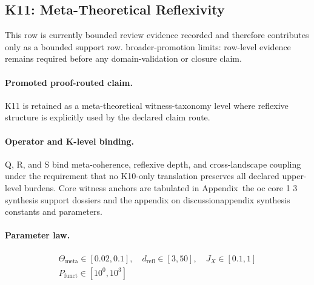 \subsection{K11: Meta-Theoretical Reflexivity}
\label{sec:oc-core-1-3-synthesis-k11}
This row is currently bounded review evidence recorded and therefore contributes only as a bounded support row.
broader-promotion limits: row-level evidence remains required before any domain-validation or closure claim.

\paragraph{Promoted proof-routed claim.}
K11 is retained as a meta-theoretical witness-taxonomy level where reflexive structure is explicitly used by the declared claim route.

\paragraph{Operator and K-level binding.}
Q, R, and S bind meta-coherence, reflexive depth, and cross-landscape coupling under the requirement that no K10-only translation preserves all declared upper-level burdens.
Core witness anchors are tabulated in Appendix~the oc core 1 3 synthesis support dossiers and the appendix on discussionappendix synthesis constants and parameters.

\paragraph{Parameter law.}
\[
\begin{gathered} \Theta_{\mathrm{meta}} \in [0.02,0.1],\quad d_{\mathrm{refl}} \in [3,50],\quad J_X \in [0.1,1] \\ P_{\mathrm{funct}} \in [10^0,10^3] \end{gathered}
\]

